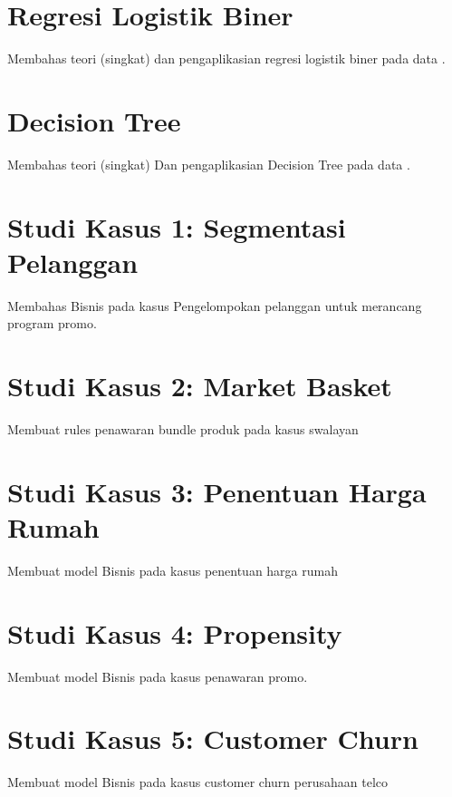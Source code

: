 \documentclass[]{book}
\begin{document}
\hypertarget{logreg}{%
\chapter{Regresi Logistik Biner}\label{logreg}}

Membahas teori (singkat) dan pengaplikasian regresi logistik biner pada data .

\hypertarget{dectree}{%
\chapter{Decision Tree}\label{dectree}}

Membahas teori (singkat) Dan pengaplikasian Decision Tree pada data .

\hypertarget{custseg}{%
\chapter{Studi Kasus 1: Segmentasi Pelanggan}\label{custseg}}

Membahas Bisnis pada kasus Pengelompokan pelanggan untuk merancang program promo.

\hypertarget{mba}{%
\chapter{Studi Kasus 2: Market Basket}\label{mba}}

Membuat rules penawaran bundle produk pada kasus swalayan

\hypertarget{houseprice}{%
\chapter{Studi Kasus 3: Penentuan Harga Rumah}\label{houseprice}}

Membuat model Bisnis pada kasus penentuan harga rumah

\hypertarget{propensity}{%
\chapter{Studi Kasus 4: Propensity}\label{propensity}}

Membuat model Bisnis pada kasus penawaran promo.

\hypertarget{churn}{%
\chapter{Studi Kasus 5: Customer Churn}\label{churn}}

Membuat model Bisnis pada kasus customer churn perusahaan telco
\end{document}
